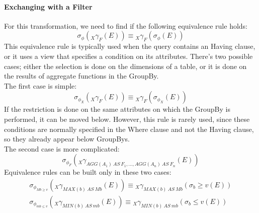 \paragraph{Exchanging with a Filter}
For this transformation, we need to find if the following equivalence rule holds:
\begin{equation*}
    \sigma_{\phi}({}_X \gamma_F (E)) \equiv {}_X \gamma_F (\sigma_{\phi}(E))
\end{equation*}
This equivalence rule is typically used when the query contains an Having clause, or it uses a view that specifies a condition on its attributes. There's two possible cases; either the selection is done on the dimensions of a table, or it is done on the results of aggregate functions in the GroupBy. \\
The first case is simple:
\begin{equation*}
    \sigma_{\phi_X} ({}_X \gamma_F (E)) \equiv {}_X \gamma_F (\sigma_{\phi_X} (E))
\end{equation*}
If the restriction is done on the same attributes on which the GroupBy is performed, it can be moved below. However, this rule is rarely used, since these conditions are normally specified in the Where clause and not the Having clause, so they already appear below GroupBys. \\
The second case is more complicated:
\begin{equation*}
    \sigma_{\phi_F} ({}_X \gamma_{AGG(A_1) \ AS \ F_1, \dots, AGG(A_n) \ AS \ F_n} (E))
\end{equation*}
Equivalence rules can be built only in these two cases:
\begin{gather*}
    \sigma_{\phi_{Mb \geq v}} ({}_X \gamma_{MAX(b) \ AS \ Mb} (E)) \equiv {}_X \gamma_{MAX(b) \ AS \ Mb} (\sigma_{b} \geq v(E))\\
    \sigma_{\phi_{mb \leq v}} ({}_X \gamma_{MIN(b) \ AS \ mb} (E)) \equiv {}_X \gamma_{MIN(b) \ AS \ mb} (\sigma_{b} \leq v(E))
\end{gather*}